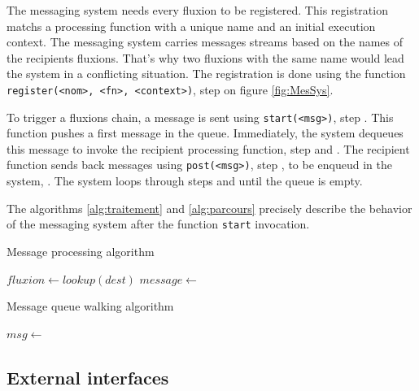 The messaging system needs every fluxion to be registered.
This registration matchs a processing function with a unique name and an initial execution context.
The messaging system carries messages streams based on the names of the recipients fluxions.
That's why two fluxions with the same name would lead the system in a conflicting situation.
The registration is done using the function \texttt{register(<nom>, <fn>, <context>)}, step  on figure \ref{fig:MesSys}.

To trigger a fluxions chain, a message is sent using \texttt{start(<msg>)}, step .
This function pushes a first message in the queue.
Immediately, the system dequeues this message to invoke the recipient processing function, step  and .
The recipient function sends back messages using \texttt{post(<msg>)}, step , to be enqueud in the system, .
The system loops through steps  and  until the queue is empty.

The algorithms \ref{alg:traitement} and \ref{alg:parcours} precisely describe the behavior of the messaging system after the function \texttt{start} invocation.

\begin{algorithm}
\caption{Message processing algorithm}
\label{alg:traitement}
\begin{algorithmic}
\State $fluxion \gets lookup(dest)$
\State $message \gets$  
\State {} 
\EndFor
\EndFunction
\end{algorithmic}
\end{algorithm}

\begin{algorithm}
\caption{Message queue walking algorithm}
\label{alg:parcours}
\begin{algorithmic}
\State $msg \gets$  
\State {}
\EndWhile
\EndFunction
\end{algorithmic}
\end{algorithm}

\subsection{External interfaces}

